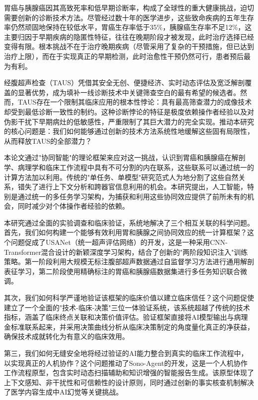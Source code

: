 
胃癌与胰腺癌因其高致死率和低早期诊断率，构成了全球性的重大健康挑战，迫切需要创新的诊断技术方法。尽管经过数十年的医学进步，这些致命疾病的五年生存率仍然顽固地保持在较低水平，胃癌生存率低于35\%，胰腺癌生存率不足12\%，这主要归因于早期疾病的隐匿性特征，往往在晚期阶段才被发现，此时治疗选择已经变得有限。根本挑战不在于治疗晚期疾病（尽管采用了复杂的干预措施，但已达到治疗上限），而在于实现真正的早期检测，此时治愈性干预仍然可行，患者预后最为有利。

经腹超声检查（TAUS）凭借其安全无创、便捷经济、实时动态评估及宽泛解剖覆盖的显著优势，成为填补一线诊断技术中关键筛查空白的最有希望的候选者。然而，TAUS存在一个限制其临床应用的根本性悖论：具有最高筛查潜力的成像技术却受到最低诊断一致性的制约。这种诊断悖论的特征是极度依赖操作者经验以及对伪影干扰下早期病灶的低敏感性，严重限制了其巨大潜力的完全实现。推动本研究的核心问题是：我们如何能够通过创新的技术方法系统性地缓解这些固有局限性，从而释放TAUS的全部潜力？

本论文通过"协同智能"的理论框架来应对这一挑战，认识到胃癌和胰腺癌在解剖学、病理学和临床工作流程中具有不可分割的内在联系，这些联系可以通过统一的计算方法加以利用。传统的"单任务、单模型"研究范式人为地分割了这些自然关系，错失了进行上下文分析和跨器官信息利用的机会。本研究提出，人工智能，特别是通过统一的多任务学习架构，为捕获和利用这些协同效应提供了前所未有的机会，同时减少对个体操作者经验的依赖。

本研究通过全面的实验调查和临床验证，系统地解决了三个相互关联的科学问题。首先，我们如何构建一个能够有效利用胃和胰腺之间协同效应的统一计算框架？这个问题促成了USANet（统一超声评估网络）的开发，这是一种采用CNN-Transformer混合设计的新颖深度学习架构，结合了创新的"两阶段知识注入"训练策略。第一阶段利用大规模无标注腹部超声数据通过自监督学习方法进行通用解剖表征学习，第二阶段使用精确标注的胃癌和胰腺癌数据集进行多任务知识联合微调。

其次，我们如何科学严谨地验证该框架的临床价值以建立临床信任？这个问题促使建立了一个全面的"技术-临床-决策"三位一体验证系统，该系统超越了传统的技术指标，涵盖了临床终点关联和决策价值评估。验证框架直接将AI模型输出与病理金标准联系起来，并采用决策曲线分析从临床决策制定的角度量化真正的净获益，确保技术成就转化为有意义的临床效用。

第三，我们如何无缝安全地将经过验证的AI能力整合到真实的临床工作流程中，以实现真正的人机协作？这个问题推动了Sono-Agent的开发，这是一个人机协作工作流程原型，包含实时动态扫描辅助和知识增强的智能报告生成。该原型体现了上下文感知、非干扰性和可信赖性的设计原则，同时通过创新的事实核查机制解决了医学内容生成中AI幻觉等关键挑战。

